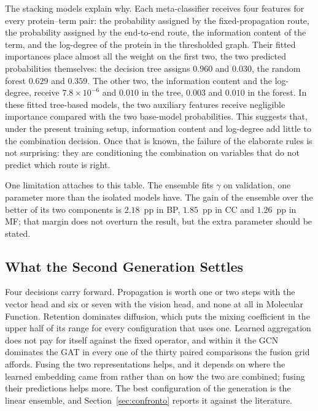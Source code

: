 \documentclass[Ingles]{ic-tese-v3}
\begin{document}
The stacking models explain why. Each meta-classifier receives four features for every
protein--term pair: the probability assigned by the fixed-propagation route, the probability
assigned by the end-to-end route, the information content of the term, and the log-degree of
the protein in the thresholded graph. Their fitted importances place almost all the weight
on the first two, the two predicted probabilities themselves: the decision tree assigns
$0.960$ and $0.030$, the random forest $0.629$ and $0.359$. The other two, the information
content and the log-degree, receive $7.8\times10^{-6}$ and $0.010$ in the tree, $0.003$ and
$0.010$ in the forest. In these fitted tree-based models, the two auxiliary features receive negligible importance compared with the two base-model probabilities. This suggests that, under the present training setup, information content and log-degree add little to the combination decision. Once that is known, the failure of the elaborate rules is not surprising: they
are conditioning the combination on variables that do not predict which route is right.

One limitation attaches to this table. The ensemble fits $\gamma$ on validation, one
parameter more than the isolated models have. The gain of the ensemble over the better of
its two components is $2.18$~pp in BP, $1.85$~pp in CC and $1.26$~pp in MF; that margin
does not overturn the result, but the extra parameter should be stated.

\subsection{What the Second Generation Settles}
Four decisions carry forward. Propagation is worth one or two steps with the vector head
and six or seven with the vision head, and none at all in Molecular Function. Retention
dominates diffusion, which puts the mixing coefficient in the upper half of its range for
every configuration that uses one. Learned aggregation does not pay for itself against the
fixed operator, and within it the GCN dominates the GAT in every one of the thirty paired
comparisons the fusion grid affords. Fusing the two representations helps, and it depends
on where the learned embedding came from rather than on how the two are combined; fusing
their predictions helps more. The best configuration of the generation is the linear
ensemble, and Section~\ref{sec:confronto} reports it against the literature.

\end{document}
